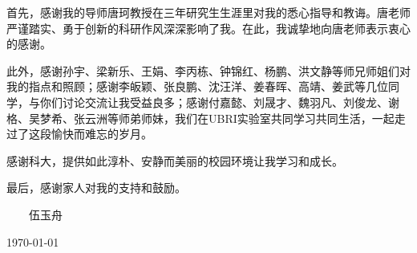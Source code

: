 ﻿
\begin{thanks}

首先，感谢我的导师唐珂教授在三年研究生生涯里对我的悉心指导和教诲。唐老师严谨踏实、勇于创新的科研作风深深影响了我。在此，我诚挚地向唐老师表示衷心的感谢。

此外，感谢孙宇、梁新乐、王娟、李丙栋、钟锦红、杨鹏、洪文静等师兄师姐们对我的指点和照顾；感谢李皈颖、张良鹏、沈汪洋、姜春晖、高靖、姜武等几位同学，与你们讨论交流让我受益良多；感谢付嘉懿、刘晟才、魏羽凡、刘俊龙、谢格、吴梦希、张云洲等师弟师妹，我们在UBRI实验室共同学习共同生活，一起走过了这段愉快而难忘的岁月。

感谢科大，提供如此淳朴、安静而美丽的校园环境让我学习和成长。

最后，感谢家人对我的支持和鼓励。

\vskip 18pt

\begin{flushright}

~~~~伍玉舟~~~~

\today

\end{flushright}

\end{thanks}
